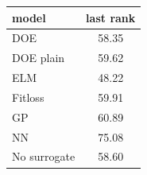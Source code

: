 \begin{tabular}{|lc|}
\hline
model & last rank\\
\hline
DOE & 58.35 \\
DOE plain & 59.62 \\
ELM & 48.22 \\
Fitloss & 59.91 \\
GP & 60.89 \\
NN & 75.08 \\
No surrogate & 58.60 \\
\hline
\end{tabular}
